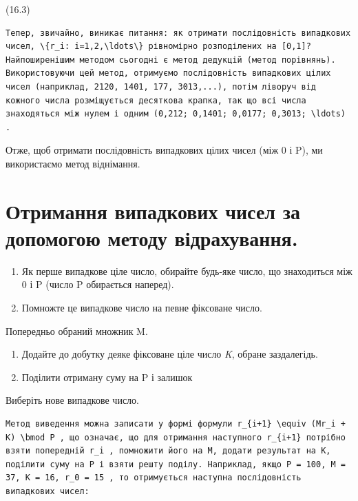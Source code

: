 \documentclass[
  ukrainian,
]{article}
\begin{document}
(16.3)

\begin{verbatim}
Тепер, звичайно, виникає питання: як отримати послідовність випадкових чисел, \{r_i: i=1,2,\ldots\} рівномірно розподілених на [0,1]? Найпоширенішим методом сьогодні є метод дедукцій (метод порівнянь). Використовуючи цей метод, отримуємо послідовність випадкових цілих чисел (наприклад, 2120, 1401, 177, 3013,...), потім ліворуч від кожного числа розміщується десяткова крапка, так що всі числа знаходяться між нулем і одним (0,212; 0,1401; 0,0177; 0,3013; \ldots) .
\end{verbatim}

Отже, щоб отримати послідовність випадкових цілих чисел (між 0 і P), ми
використаємо метод віднімання.

\section{Отримання випадкових чисел за допомогою методу
відрахування.}\label{ux43eux442ux440ux438ux43cux430ux43dux43dux44f-ux432ux438ux43fux430ux434ux43aux43eux432ux438ux445-ux447ux438ux441ux435ux43b-ux437ux430-ux434ux43eux43fux43eux43cux43eux433ux43eux44e-ux43cux435ux442ux43eux434ux443-ux432ux456ux434ux440ux430ux445ux443ux432ux430ux43dux43dux44f.}

\begin{enumerate}
\def\labelenumi{\arabic{enumi}.}
\item
  Як перше випадкове ціле число, обирайте будь-яке число, що знаходиться
  між 0 і P (число P обирається наперед).
\item
  Помножте це випадкове число на певне фіксоване число.
\end{enumerate}

Попередньо обраний множник M.

\begin{enumerate}
\def\labelenumi{\arabic{enumi}.}
\setcounter{enumi}{2}
\item
  Додайте до добутку деяке фіксоване ціле число \emph{K}, обране
  заздалегідь.
\item
  Поділити отриману суму на P і залишок
\end{enumerate}

Виберіть нове випадкове число.

\begin{verbatim}
Метод виведення можна записати у формі формули r_{i+1} \equiv (Mr_i + K) \bmod P , що означає, що для отримання наступного r_{i+1} потрібно взяти попередній r_i , помножити його на M, додати результат на K, поділити суму на P і взяти решту поділу. Наприклад, якщо P = 100, M = 37, K = 16, r_0 = 15 , то отримується наступна послідовність випадкових чисел:
\end{verbatim}
\end{document}
